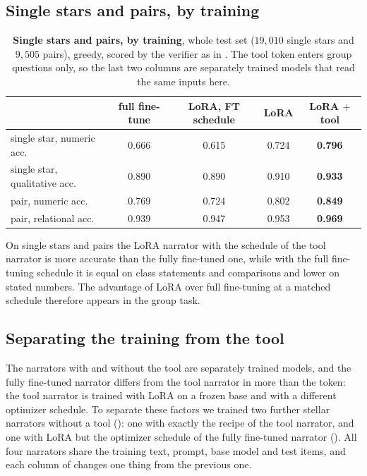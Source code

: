\subsection{Single stars and pairs, by training}\label{app:regime}
\begin{table}[h]\centering\small
\caption{\textbf{Single stars and pairs, by training}, whole test set ($19{,}010$ single
stars and $9{,}505$ pairs), greedy, scored by the verifier as in . The
tool token enters group questions only, so the last two columns are separately trained
models that read the same inputs here.}
\label{tab:regime}
\begin{tabular}{lcccc}
\toprule
 & full fine-tune & LoRA, FT schedule & LoRA & LoRA $+$ tool \\
\midrule
single star, numeric acc.     & 0.666 & 0.615 & 0.724 & \textbf{0.796} \\
single star, qualitative acc. & 0.890 & 0.890 & 0.910 & \textbf{0.933} \\
pair, numeric acc.            & 0.769 & 0.724 & 0.802 & \textbf{0.849} \\
pair, relational acc.         & 0.939 & 0.947 & 0.953 & \textbf{0.969} \\
\bottomrule
\end{tabular}
\end{table}



On single stars and pairs the LoRA narrator with the schedule of the tool narrator is more
accurate than the fully fine-tuned one, while with the full fine-tuning schedule it is equal on
class statements and comparisons and lower on stated numbers. The advantage of LoRA over full
fine-tuning at a matched schedule therefore appears in the group task.

\subsection{Separating the training from the tool}\label{sec:tokenortraining}
The narrators with and without the tool are separately trained models, and the fully
fine-tuned narrator differs from the tool narrator in more than the token: the tool narrator
is trained with LoRA on a frozen base and with a different optimizer schedule. To separate
these factors we trained two further stellar narrators without a tool
(): one with exactly the recipe of the tool narrator, and one with LoRA but
the optimizer schedule of the fully fine-tuned narrator (). All four
narrators share the training text, prompt, base model and test items, and each column of
 changes one thing from the previous one.

